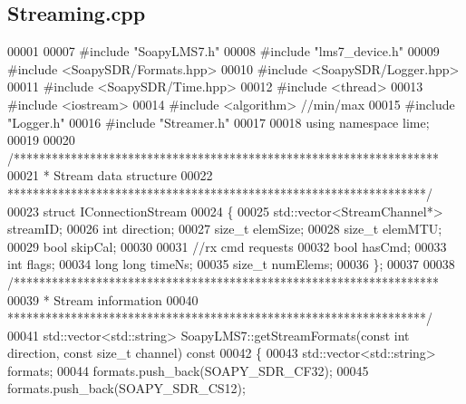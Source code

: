 \subsection{Streaming.\+cpp}
\label{Streaming_8cpp_source}

\begin{DoxyCode}
00001 
00007 \textcolor{preprocessor}{#include "SoapyLMS7.h"}
00008 \textcolor{preprocessor}{#include "lms7_device.h"}
00009 \textcolor{preprocessor}{#include <SoapySDR/Formats.hpp>}
00010 \textcolor{preprocessor}{#include <SoapySDR/Logger.hpp>}
00011 \textcolor{preprocessor}{#include <SoapySDR/Time.hpp>}
00012 \textcolor{preprocessor}{#include <thread>}
00013 \textcolor{preprocessor}{#include <iostream>}
00014 \textcolor{preprocessor}{#include <algorithm>} \textcolor{comment}{//min/max}
00015 \textcolor{preprocessor}{#include "Logger.h"}
00016 \textcolor{preprocessor}{#include "Streamer.h"}
00017 
00018 \textcolor{keyword}{using namespace }lime;
00019 
00020 \textcolor{comment}{/*******************************************************************}
00021 \textcolor{comment}{ * Stream data structure}
00022 \textcolor{comment}{ ******************************************************************/}
00023 \textcolor{keyword}{struct }IConnectionStream
00024 \{
00025     std::vector<StreamChannel*> streamID;
00026     \textcolor{keywordtype}{int} direction;
00027     \textcolor{keywordtype}{size\_t} elemSize;
00028     \textcolor{keywordtype}{size\_t} elemMTU;
00029     \textcolor{keywordtype}{bool} skipCal;
00030 
00031     \textcolor{comment}{//rx cmd requests}
00032     \textcolor{keywordtype}{bool} hasCmd;
00033     \textcolor{keywordtype}{int} flags;
00034     \textcolor{keywordtype}{long} \textcolor{keywordtype}{long} timeNs;
00035     \textcolor{keywordtype}{size\_t} numElems;
00036 \};
00037 
00038 \textcolor{comment}{/*******************************************************************}
00039 \textcolor{comment}{ * Stream information}
00040 \textcolor{comment}{ ******************************************************************/}
00041 std::vector<std::string> SoapyLMS7::getStreamFormats(\textcolor{keyword}{const} \textcolor{keywordtype}{int} direction, \textcolor{keyword}{const} \textcolor{keywordtype}{size\_t} channel)\textcolor{keyword}{ const}
00042 \textcolor{keyword}{}\{
00043     std::vector<std::string> formats;
00044     formats.push\_back(SOAPY_SDR_CF32);
00045     formats.push\_back(SOAPY_SDR_CS12);

\end{DoxyCode}
